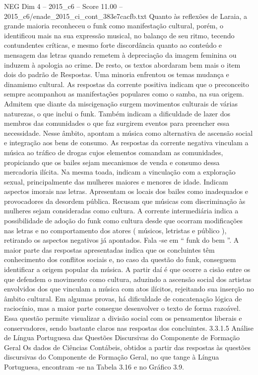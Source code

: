 \begin{textsample}{NEG Dim 4 – 2015\_c6 – Score 11.00 – 2015\_c6/enade\_2015\_ci\_cont\_383e7cacfb.txt}
Quanto às reflexões de Laraia, a grande maioria reconheceu o funk como manifestação cultural, porém, o identificou mais na sua expressão musical, no balanço de seu ritmo, tecendo contundentes críticas, e mesmo forte discordância quanto ao conteúdo e mensagem das letras quando remetem à depreciação da imagem feminina ou induzem à apologia ao crime.
De resto, os textos abordaram bem mais o item dois do padrão de Respostas.
Uma minoria enfrentou os temas mudança e dinamismo cultural.
As respostas da corrente positiva indicam que o preconceito sempre acompanhou as manifestações populares como o samba, na sua origem.
Admitem que diante da miscigenação surgem movimentos culturais de várias naturezas, o que inclui o funk.
Também indicam a dificuldade de lazer dos membros das comunidades o que faz surgirem eventos para preencher essa necessidade.
Nesse âmbito, apontam a música como alternativa de ascensão social e integração aos bens de consumo.
As respostas da corrente negativa vinculam a música ao tráfico de drogas cujos elementos comandam as comunidades, propiciando que os bailes sejam mecanismos de venda e consumo dessa mercadoria ilícita.
Na mesma toada, indicam a vinculação com a exploração sexual, principalmente das mulheres maiores e menores de idade.
Indicam aspectos imorais nas letras.
Apresentam os locais dos bailes como inadequados e provocadores da desordem pública.
Recusam que músicas com discriminação às mulheres sejam consideradas como cultura.
A corrente intermediária indica a possibilidade de adoção do funk como cultura desde que ocorram modificações nas letras e no comportamento dos atores ( músicos, letristas e público ), retirando os aspectos negativos já apontados.
Fala -se em “ funk do bem ”.
A maior parte das respostas apresentadas indica que os concluintes têm conhecimento dos conflitos sociais e, no caso da questão do funk, conseguem identificar a origem popular da música.
A partir daí é que ocorre a cisão entre os que defendem o movimento como cultura, aduzindo a ascensão social dos artistas envolvidos dos que vinculam a música com atos ilícitos, rejeitando sua inserção no âmbito cultural.
Em algumas provas, há dificuldade de concatenação lógica de raciocínio, mas a maior parte consegue desenvolver o texto de forma razoável.
Essa questão permite visualizar a divisão social com os pensamentos liberais e conservadores, sendo bastante claros nas respostas dos concluintes. 3.3.1.5 Análise de Língua Portuguesa das Questões Discursivas do Componente de Formação Geral Os dados de Ciências Contábeis, obtidos a partir das respostas às questões discursivas do Componente de Formação Geral, no que tange à Língua Portuguesa, encontram -se na Tabela 3.16 e no Gráfico 3.9.

\end{textsample}
